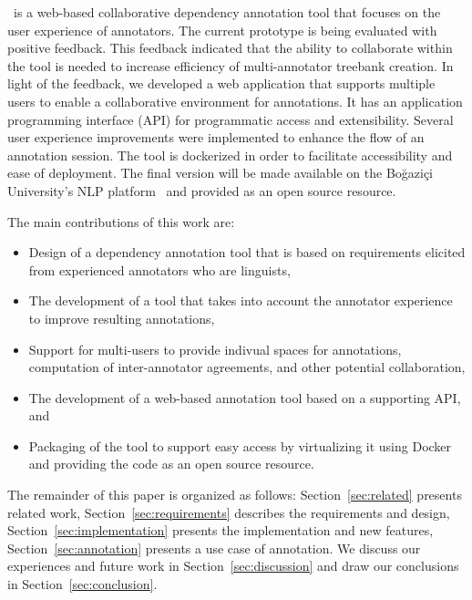 \boatvtwo\ is a web-based collaborative dependency annotation tool that focuses on the user experience of annotators.
The current prototype is being evaluated with positive feedback.
This feedback indicated that the ability to collaborate within the tool is needed to increase efficiency of multi-annotator treebank creation.
In light of the feedback, we developed a web application that supports multiple users to enable a collaborative environment for annotations.
It has an application programming interface (API) for programmatic access and extensibility.
Several user experience improvements were implemented to enhance the flow of an annotation session.
The tool is dockerized in order to facilitate accessibility and ease of deployment.
The final version will be made available on the Boğaziçi University's NLP platform~\cite{DIP} and provided as an open source resource.

The main contributions of this work are:
\begin{itemize}
\setlength\itemsep{0em}
        \item Design of a dependency annotation tool that is based on requirements elicited from experienced annotators who are linguists,
        \item The development of a tool that takes into account the annotator experience to improve resulting annotations,
        \item Support for multi-users to provide indivual spaces for annotations, computation of inter-annotator agreements, and other potential collaboration,
        \item The development of a web-based annotation tool based on a supporting API, and
        \item Packaging of the tool to support easy access by virtualizing it using Docker~\cite{docker} and providing the code as an open source resource.
\end{itemize}

The remainder of this paper is organized as follows:
Section~\ref{sec:related} presents related work,
Section~\ref{sec:requirements} describes the requirements and design,
Section~\ref{sec:implementation} presents the implementation and new features,
Section~\ref{sec:annotation} presents a use case of annotation.
We discuss our experiences and future work in Section~\ref{sec:discussion} and draw our conclusions in Section~\ref{sec:conclusion}.
